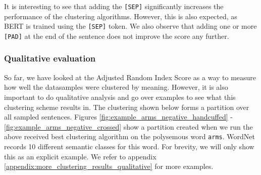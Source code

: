 \documentclass[a4paper,12pt,oneside,openright]{report}
\begin{document}
It is interesting to see that adding the \Verb#[SEP]# significantly increases the performance of the clustering algorithms.
However, this is also expected, as BERT is trained using the \Verb#[SEP]# token.
We also observe that adding one or more \Verb#[PAD]# at the end of the sentence does not improve the score any further. \\

\subsubsection{Qualitative evaluation}

So far, we have looked at the Adjusted Random Index Score as a way to measure how well the datasamples were clustered by meaning.
However, it is also important to do qualitative analysis and go over examples to see what this clustering scheme results in.
The clustering shown below forms a partition over all sampled sentences.
Figures \ref{fig:example_arms_negative_handcuffed} - \ref{fig:example_arms_negative_crossed} show a partition created when we run the above received best clustering algorithm on the polysemous word \texttt{arms}. 
WordNet records 10 different semantic classes for this word.
For brevity, we will only show this as an explicit example. 
We refer to appendix \ref{appendix:more_clustering_results_qualitative} for more examples.
\\

\begin{tcolorbox}
\label{fig:example_arms_negative_handcuffed}
\end{tcolorbox}
\end{document}
